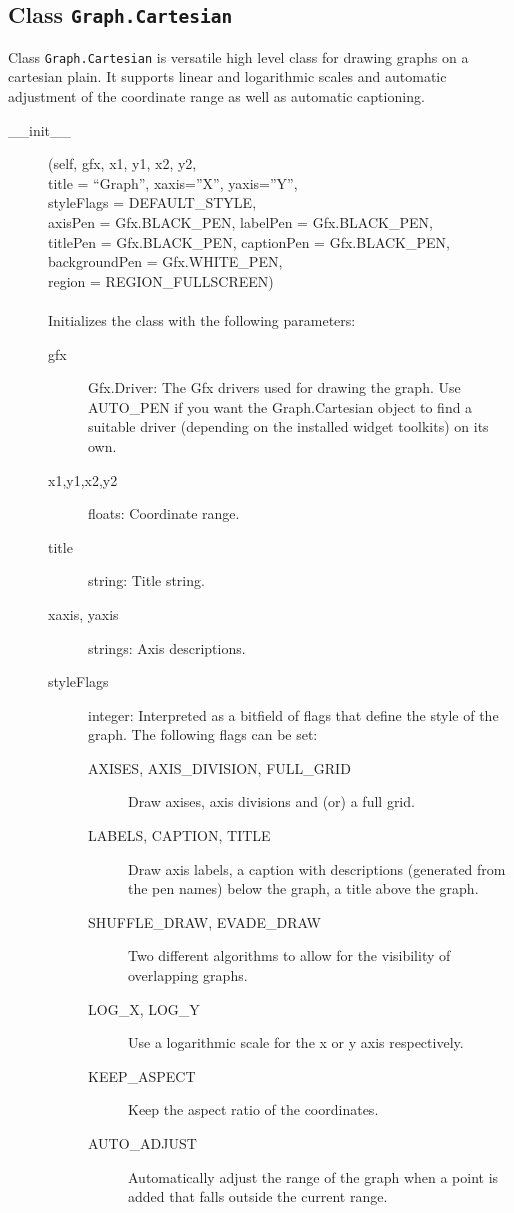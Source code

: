 \documentclass[12pt,a4paper,USenglish]{article}
\begin{document}
\subsection{Class {\tt Graph.Cartesian}} 

Class {\tt Graph.Cartesian} is versatile high level class for drawing
graphs on a cartesian plain. It supports linear and logarithmic scales
and automatic adjustment of the coordinate range as well as automatic
captioning.

\begin{description}

\item[\_\_init\_\_] (self, gfx, x1, y1, x2, y2,\\ 
                    title = ``Graph'',  xaxis=''X'', yaxis=''Y'',\\
                    styleFlags = DEFAULT\_STYLE,\\
                    axisPen = Gfx.BLACK\_PEN, labelPen = Gfx.BLACK\_PEN,\\
                    titlePen = Gfx.BLACK\_PEN, captionPen = Gfx.BLACK\_PEN,\\
                    backgroundPen = Gfx.WHITE\_PEN,\\
                    region = REGION\_FULLSCREEN)\\ 
\\Initializes the class with the following parameters:

\begin{description}

\item[gfx] Gfx.Driver: The Gfx drivers used for drawing the graph. Use
AUTO\_PEN if you want the Graph.Cartesian object to find a suitable driver
(depending on the installed widget toolkits) on its own.
\item[x1,y1,x2,y2] floats: Coordinate range.
\item[title] string: Title string.
\item[xaxis, yaxis] strings: Axis descriptions.
\item[styleFlags] integer: Interpreted as a bitfield of flags that
       define the style of the graph. The following flags can be set:

\begin{description}
\item[AXISES, AXIS\_DIVISION, FULL\_GRID] Draw axises, axis divisions 
	and (or) a full grid.
\item[LABELS, CAPTION, TITLE] Draw axis labels, a caption with descriptions 
	(generated from the pen  names) below the graph, a title above 
	the graph.
\item[SHUFFLE\_DRAW, EVADE\_DRAW] Two different algorithms to
	allow for the visibility of overlapping graphs.
\item[LOG\_X, LOG\_Y] Use a logarithmic scale for the x or y axis respectively.
\item[KEEP\_ASPECT] Keep the aspect ratio of the coordinates.
\item[AUTO\_ADJUST] Automatically adjust the range of the graph
        when a point is added that falls outside the current range.
\end{description}
                    

\end{description}
\end{description}
\end{document}
